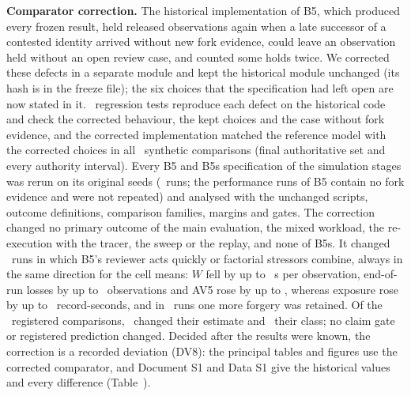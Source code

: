 \textbf{Comparator correction.} The historical implementation of B5, which produced every frozen result, held released observations again when a late successor of a contested identity arrived without new fork evidence, could leave an observation held without an open review case, and counted some holds twice. We corrected these defects in a separate module and kept the historical module unchanged (its hash is in the freeze file); the six choices that the specification had left open are now stated in it. \YRegTests\ regression tests reproduce each defect on the historical code and check the corrected behaviour, the kept choices and the case without fork evidence, and the corrected implementation matched the reference model with the corrected choices in all \YRefN\ synthetic comparisons (final authoritative set and every authority interval). Every B5 and B5s specification of the simulation stages was rerun on its original seeds (\YRunsRerun\ runs; the performance runs of B5 contain no fork evidence and were not repeated) and analysed with the unchanged scripts, outcome definitions, comparison families, margins and gates. The correction changed no primary outcome of the main evaluation, the mixed workload, the re-execution with the tracer, the sweep or the replay, and none of B5s. It changed \YRunsChanged\ runs in which B5's reviewer acts quickly or factorial stressors combine, always in the same direction for the cell means: $W$ fell by up to \YCellAllWMaxDrop~s per observation, end-of-run losses by up to \YCellAllOTwoMaxDrop\ observations and AV5 rose by up to \YCellAllAVFiveMaxRise, whereas exposure rose by up to \YCellAllNLXMaxRise\ record-seconds, and in \YRunsOOneChanged\ runs one more forgery was retained. Of the \YCmpN\ registered comparisons, \YCmpEstChanged\ changed their estimate and \YCmpClassChanged\ their class; no claim gate or registered prediction changed. Decided after the results were known, the correction is a recorded deviation (DV8): the principal tables and figures use the corrected comparator, and Document S1 and Data S1 give the historical values and every difference (Table~).

